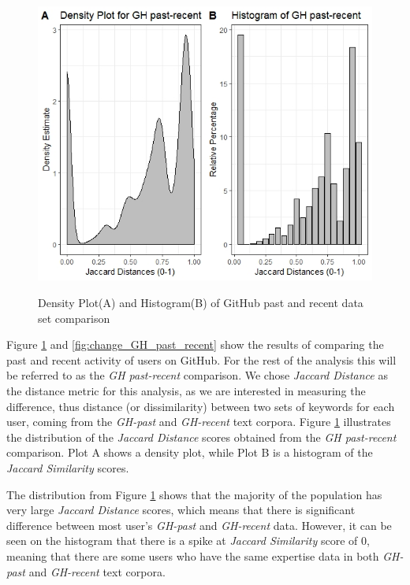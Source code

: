         \begin{figure}
          \centering
          \includegraphics[width=\textwidth]{figures/GH_past-recent.jpeg}\\
          \caption{Density Plot(A) and Histogram(B) of GitHub past and recent data set comparison}
          \label{fig:GH_past_recent}
        \end{figure}
        
         Figure \ref{fig:GH_past_recent} and \ref{fig:change_GH_past_recent} show the results of comparing the past and recent activity of users on GitHub. For the rest of the analysis this will be referred to as the \emph{GH past-recent} comparison. We chose \emph{Jaccard Distance} as the distance metric for this analysis, as we are interested in measuring the difference, thus distance (or dissimilarity) between two sets of keywords for each user, coming from the \emph{GH-past} and \emph{GH-recent} text corpora. Figure \ref{fig:GH_past_recent} illustrates the distribution of the \emph{Jaccard Distance} scores obtained from the \emph{GH past-recent} comparison. Plot A shows a density plot, while Plot B is a  histogram of the \emph{Jaccard Similarity} scores. 
         
         The distribution from Figure \ref{fig:GH_past_recent} shows that the majority of the population has very large \emph{Jaccard Distance} scores, which means that there is significant difference between most user's \emph{GH-past} and \emph{GH-recent} data. However, it can be seen on the histogram that there is a spike at \emph{Jaccard Similarity} score of 0, meaning that there are some users who have the same expertise data in both \emph{GH-past} and \emph{GH-recent} text corpora. 
        
